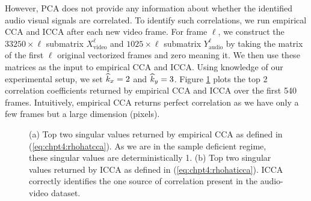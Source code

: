 However, PCA does not provide any information about whether the identified audio visual
signals are correlated. To identify such correlations, we run empirical CCA and ICCA after each new
video frame. For frame $\ell$, we construct the $33250\times\ell$ submatrix
$X_{\text{video}}^\ell$ and $1025\times\ell$ submatrix $Y_{\text{audio}}^\ell$ by taking
the matrix of the first $\ell$ original vectorized frames and zero meaning it. We then use
these matrices as the input to empirical CCA and ICCA. Using knowledge of our experimental
setup, we set $\widehat{k}_x=2$ and $\widehat{k}_y=3$. Figure \ref{fig:chpt4:av_corrs} plots the top 2
correlation coefficients returned by empirical CCA and ICCA over the first 540
frames. Intuitively, empirical CCA returns perfect correlation as we have only a few
frames but a large dimension (pixels).



\begin{figure}
  \begin{center}
    \caption{(a) Top two singular values returned by empirical CCA as defined in
      (\ref{eq:chpt4:rhohatcca}). As we are in the sample deficient regime, these singular
      values are deterministically 1. (b) Top two singular values returned by ICCA as
      defined in (\ref{eq:chpt4:rhohaticca}). ICCA correctly identifies the one source of
      correlation present in the audio-video dataset.}
    \label{fig:chpt4:av_corrs}
  \end{center}
\end{figure}


